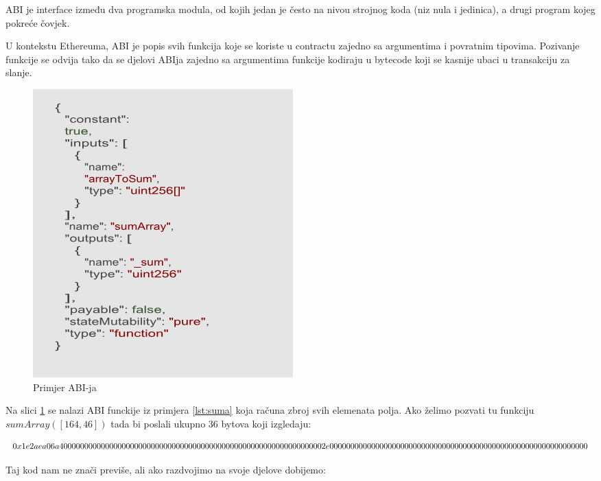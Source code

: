 \documentclass[12pt]{report}
\begin{document}
\begin{definicija}
ABI je interface između dva programska modula, od kojih jedan je često na nivou strojnog koda (niz nula i jedinica), a drugi program kojeg pokreće čovjek.
\end{definicija}

U kontekstu Ethereuma, ABI je popis svih funkcija koje se koriste u contractu zajedno sa argumentima i povratnim tipovima. Pozivanje funkcije se odvija tako da se djelovi ABIja zajedno sa argumentima funkcije kodiraju u bytecode koji se kasnije ubaci u transakciju za slanje.

\begin{figure}[!]
\centering
\includegraphics[scale=0.7]{abi}
\caption{Primjer ABI-ja}
\label{fig:abi}
\end{figure}

Na slici \ref{fig:abi} se nalazi ABI funckije iz primjera \ref{lst:suma} koja računa zbroj svih elemenata polja. Ako želimo pozvati tu funkciju $sumArray([164, 46])$ tada bi poslali ukupno 36 bytova koji izgledaju: 


\begin{dmath}
\label{eq:sumabi}
    0x1e2aea06a40000000000000000000000000000000000000000000\\00000000000000000002e000000000000000000000000000000000\\00000000000000000000000000000
\end{dmath}

Taj kod nam ne znači previše, ali ako razdvojimo na svoje djelove dobijemo: 
\end{document}
